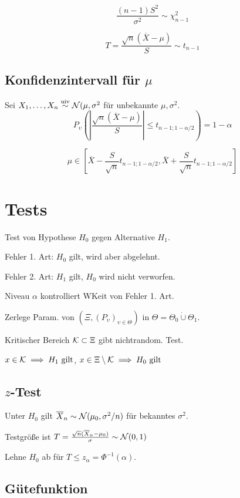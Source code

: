 \[ \frac{(n-1)S^2}{\sigma^2} \sim \chi_{n-1}^2 \]

\[ T = \frac{\sqrt{n}(\overline X - \mu)}{S} \sim t_{n-1} \]

\subsection*{Konfidenzintervall für \(\mu\)}

Sei \(X_1,\dots,X_n \stackrel{\text{uiv}}{\sim} \mathcal{N}(\mu,\sigma^2\) für unbekannte \(\mu, \sigma^2\).
\[ P_\upsilon\left(\left|\frac{\sqrt{n}(\overline X - \mu)}{S}\right| \leq t_{n-1;1-\alpha/2}\right) = 1-\alpha \]

\[ \mu \in \left[\overline X - \frac{S}{\sqrt{n}} t_{n-1;1-\alpha/2}, \overline X + \frac{S}{\sqrt{n}} t_{n-1;1-\alpha/2} \right] \]

\section*{Tests}

Test von Hypothese \(H_0\) gegen Alternative \(H_1\).

Fehler 1. Art: \(H_0\) gilt, wird aber abgelehnt.

Fehler 2. Art: \(H_1\) gilt, \(H_0\) wird nicht verworfen.

Niveau \(\alpha\) kontrolliert WKeit von Fehler 1. Art.

Zerlege Param. von \((\Xi, (P_\upsilon)_{\upsilon \in \Theta})\) in \(\Theta = \Theta_0 \dot\cup \Theta_1\).

Kritischer Bereich \(\mathcal{K} \subset \Xi\) gibt nichtrandom. Test.

\(x \in \mathcal{K} \implies H_1 \text{ gilt}\), \(x \in \Xi \setminus \mathcal{K} \implies H_0 \text { gilt}\)

\subsection*{\(z\)-Test}

Unter \(H_0\) gilt \(\overline X_n \sim \mathcal{N}(\mu_0,\sigma^2/n)\) für bekanntes \(\sigma^2\).

Testgröße ist \(T = \frac{\sqrt{n}(\overline X_n - \mu_0)}{\sigma} \sim \mathcal{N}(0,1)\)

Lehne \(H_0\) ab für \(T \leq z_\alpha = \Phi^{-1}(\alpha)\).

\subsection*{Gütefunktion}

